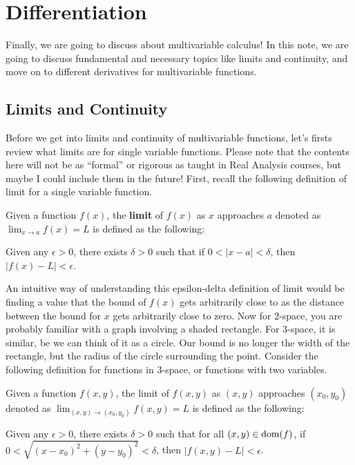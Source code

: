 \documentclass[../../../main.tex]{subfiles}
\begin{document}
\chapter{Differentiation}

Finally, we are going to discuss about multivariable calculus!
In this note, we are going to discuss fundamental and necessary topics
like limits and continuity, and move on to different derivatives for
multivariable functions.

\section{Limits and Continuity}

Before we get into limits and continuity of multivariable functions,
let's firsts review what limits are for single variable functions.
Please note that the contents here will not be as ``formal'' or
rigorous as taught in Real Analysis courses, but maybe I could
include them in the future! First, recall the following definition
of limit for a single variable function.

\begin{definition}{}{}
Given a function $f(x)$, the \textbf{limit} of $f(x)$ as $x$
approaches $a$ denoted as $\lim_{x \to a} f(x) = L$ is defined
as the following:
\vspace{0.8\baselineskip}
\begin{center}
\begin{minipage}{0.7\textwidth}
Given any $\epsilon > 0$, there exists $\delta > 0$ such that
if $0 < | x - a | < \delta$, then $| f(x) - L | < \epsilon$.
\end{minipage}
\end{center}
\end{definition}

An intuitive way of understanding this epsilon-delta definition of
limit would be finding a value that the bound of $f(x)$ gets
arbitrarily close to as the distance between the bound for $x$ gets
arbitrarily close to zero. Now for $2$-space, you are probably
familiar with a graph involving a shaded rectangle. For $3$-space,
it is similar, be we can think of it as a circle. Our bound is no
longer the width of the rectangle, but the radius of the circle
surrounding the point. Consider the following definition for
functions in $3$-space, or functions with two variables.

\begin{definition}{}{}
Given a function $f(x, y)$, the limit of $f(x, y)$ as $(x, y)$
approaches $(x_0, y_0)$ denoted as $\lim_{(x, y) \to (x_0, y_0)}
f(x, y) = L$ is defined as the following:
\vspace{0.6\baselineskip}
\begin{center}
\begin{minipage}{0.8\textwidth}
Given any $\epsilon > 0$, there exists $\delta > 0$ such that
for all $(x, y) \in \operatorname{dom}(f)$, if $0 < \sqrt{(x - x_0)^2 + (y - y_0)^2}
< \delta$, then $| f(x, y) - L | < \epsilon$.
\end{minipage}
\end{center}
\end{definition}
\end{document}
